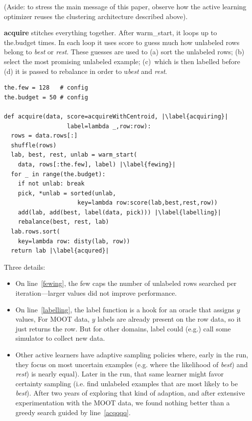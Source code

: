 \documentclass[AMA,STIX2COL]{WileyNJDv5}
\begin{document}
{(Aside: to stress the main 
message of this paper, observe how the active learning optimizer reuses the 
clustering architecture described above).


\textbf{acquire} stitches everything together. After \textsf{warm\_start}, 
it loops up to \textsf{the.budget} times.
In each loop it uses \textsf{score} to guess  much how unlabeled rows
belong to {\em best} or {\em rest}. These guesses
are used to (a) sort the   unlabeled rows; (b) select the most promising
unlabeled example; (c)~which is then labelled
before (d) it is passed to   \textsf{rebalance}  in order to
u\textit{best} and 
\textit{rest}.
\begin{verbatim}
the.few = 128   # config
the.budget = 50 # config

def acquire(data, score=acquireWithCentroid, |\label{acquiring}|
                  label=lambda _,row:row): 
  rows = data.rows[:]
  shuffle(rows)
  lab, best, rest, unlab = warm_start(
    data, rows[:the.few], label) |\label{fewing}|
  for _ in range(the.budget):
    if not unlab: break
    pick, *unlab = sorted(unlab,
                     key=lambda row:score(lab,best,rest,row))
    add(lab, add(best, label(data, pick))) |\label{labelling}|
    rebalance(best, rest, lab)
  lab.rows.sort(
    key=lambda row: disty(lab, row))
  return lab |\label{acqured}|
\end{verbatim}
Three details:
\begin{itemize}
\item
On  line~\ref{fewing}, 
the \textsf{few} caps the number of unlabeled rows searched
 per iteration---larger values did not improve performance.
\item
On line~\ref{labelling},
the 
\textsf{label} function is 
a hook for an oracle  that assigns $y$ values,
For MOOT data, $y$ labels are already present on the row data, so it just returns
the   row. But for other domains, \textsf{label} could (e.g.) call some
simulator to collect new data.
\item
Other active learners have adaptive sampling policies where, early in the run,
they focus on   most uncertain
examples (e.g. where the likelihood of {\em best}) and {\em rest}) is nearly equal). Later in the run, that same learner  might favor  certainty sampling (i.e. find unlabeled examples that are most
likely to be {\em best}). After two years of exploring that kind of adaption, and after extensive
experimentation with the MOOT data, we found   nothing   better than
a
greedy search guided by line~\ref{acqqqq}.
\end{itemize}


}
\end{document}
